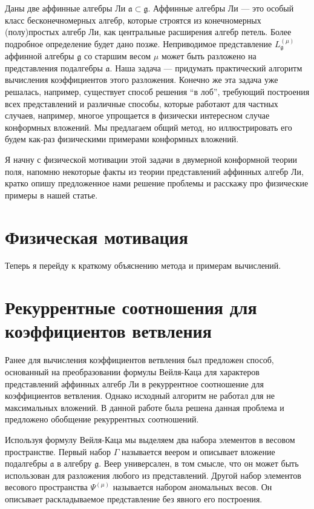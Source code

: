 Даны две аффинные алгебры Ли $\mathfrak{a}\subset \mathfrak{g}$. Аффинные алгебры Ли --- это особый
класс бесконечномерных алгебр, которые строятся из конечномерных (полу)простых алгебр Ли, как
центральные расширения алгебр петель. Более подробное определение будет дано позже. Неприводимое
представление $L^{(\mu)}_{\mathfrak{g}}$ аффинной алгебры $\mathfrak{g}$ со старшим весом $\mu$
может быть разложено на представления подалгебры $\mathfrak{a}$. Наша задача --- придумать
практический алгоритм вычисления коэффициентов этого разложения. Конечно же эта задача уже решалась,
например, существует способ решения ``в лоб'', требующий построения всех представлений и различные способы,
которые работают для частных случаев, например, многое упрощается в физически интересном случае
конформных вложений. Мы предлагаем общий метод, но иллюстрировать его будем как-раз физическими
примерами конформных вложений.

Я начну с физической мотивации этой задачи в двумерной конформной теории поля, напомню некоторые
факты из теории представлений аффинных алгебр Ли, кратко опишу предложенное нами решение проблемы и
расскажу про физические примеры в нашей статье.

\section{Физическая мотивация}
\label{sec:physics}


Теперь я перейду к краткому объяснению метода и примерам вычислений.

\section{Рекуррентные соотношения для коэффициентов ветвления}
\label{sec:branching}

Ранее для вычисления коэффициентов ветвления был предложен способ, основанный на преобразовании
формулы Вейля-Каца для характеров представлений аффинных алгебр Ли в рекуррентное соотношение для
коэффициентов ветвления. Однако исходный алгоритм не работал для не максимальных вложений. В данной
работе была решена данная проблема и предложено обобщение рекуррентных соотношений. 

Используя формулу Вейля-Каца мы выделяем два набора элементов в весовом пространстве. Первый набор $\Gamma$
называется веером и описывает вложение подалгебры $\mathfrak{a}$ в алгебру $\mathfrak{g}$. Веер
универсален, в том смысле, что он может быть использован для разложения любого из представлений.
Другой набор элементов весового пространства $\Psi ^{\left( \mu \right) }$ называется набором
аномальных весов. Он описывает раскладываемое представление без явного его построения. 

